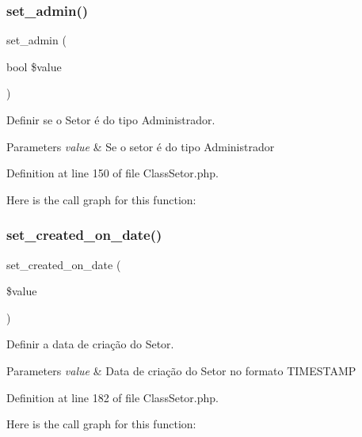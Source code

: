 \subsubsection{\texorpdfstring{set\+\_\+admin()}{set\_admin()}}
{\footnotesize\ttfamily set\+\_\+admin (\begin{DoxyParamCaption}\item[{bool}]{\$value }\end{DoxyParamCaption})}



Definir se o Setor é do tipo Administrador. 


\begin{DoxyParams}{Parameters}
{\em value} & Se o setor é do tipo Administrador \\
\hline
\end{DoxyParams}


Definition at line 150 of file Class\+Setor.\+php.

Here is the call graph for this function\+:
\mbox{\label{class_class_setor_a792b5876e9d76a4f030e436aeec2a855}} 
\subsubsection{\texorpdfstring{set\+\_\+created\+\_\+on\+\_\+date()}{set\_created\_on\_date()}}
{\footnotesize\ttfamily set\+\_\+created\+\_\+on\+\_\+date (\begin{DoxyParamCaption}\item[{}]{\$value }\end{DoxyParamCaption})}



Definir a data de criação do Setor. 


\begin{DoxyParams}{Parameters}
{\em value} & Data de criação do Setor no formato T\+I\+M\+E\+S\+T\+A\+MP \\
\hline
\end{DoxyParams}


Definition at line 182 of file Class\+Setor.\+php.

Here is the call graph for this function\+:
\mbox{\label{class_class_setor_acd0a4e339896072e5515b8fdcc33344d}} 
